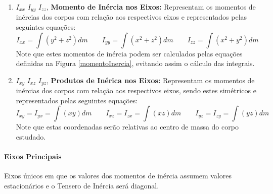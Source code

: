 \documentclass{article}
\begin{document}
                \begin{enumerate}[rightmargin = \leftmargin]
                    \item $I_{xx}$ $I_{yy}$ $I_{zz}$, \textbf{Momento de Inércia nos Eixos:} Representam os momentos de inércias dos corpos com relação aos respectivos eixos e representados pelas seguintes equações:
                        \begin{equation}
                            \boxed{I_{xx} = \int(y^2 + z^2)dm} \qquad 
                            \boxed{I_{yy} = \int(x^2 + z^2)dm} \qquad 
                            \boxed{I_{zz} = \int(x^2 + y^2)dm}
                        \end{equation}
                    Note que estes momentos de inércia podem ser calculados pelas equações definidas na Figura \ref{momentoInercia}, evitando assim o cálculo das integrais.

                    \item $I_{xy}$ $I_{xz}$ $I_{yz}$, \textbf{Produtos de Inérica nos Eixos:} Representam os momentos de inércias dos corpos com relação aos respectivos eixos, sendo estes simétricos e representados pelas seguintes equações:
                        \begin{equation}
                            \boxed{I_{xy} = I_{yx} = \int(xy)dm} \qquad 
                            \boxed{I_{xz} = I_{zx} = \int(xz)dm} \qquad 
                            \boxed{I_{yz} = I_{zy} = \int(yz)dm}
                        \end{equation}
                    Note que estas coordenadas serão relativas ao centro de massa do corpo estudado.
                \end{enumerate}

            \paragraph{Eixos Principais}Eixos únicos em que os valores dos momentos de inércia assumem valores estacionários e o Tensero de Inércia será diagonal.
\end{document}
